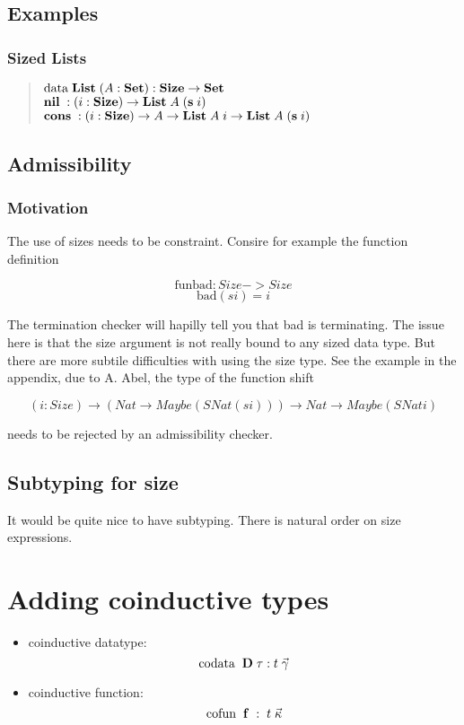 \section{Examples}
\subsection{Sized Lists}
\begin{quote}
$\mathrm{data}\; \mathbf{List}\; ( A : \mathbf{Set} ) : \mathbf{Size} \rightarrow \mathbf{Set} $ 
\\
$\mathbf{nil}\; : ( i : \mathbf{Size} ) \rightarrow  \mathbf{List}\; A \; (\mathbf{s}\; i) $
\\
$\mathbf{cons}\; : ( i : \mathbf{Size} ) \rightarrow  A \rightarrow \mathbf{List}\; A \; i \rightarrow \mathbf{List}\; A \; (\mathbf{s}\; i) $
\end{quote}

\section{Admissibility}
\subsection{Motivation}
The use of sizes needs to be constraint.
Consire for example the function definition

\[ \mathrm{fun} \mathrm{bad} : Size -> Size \]
\[ \mathrm{bad} (s i) = i \]

The termination checker will hapilly tell you that bad is terminating.
The issue here is that the size argument is not really bound to any sized data type.
But there are more subtile difficulties with using the size type.
See the example in the appendix, due to A. Abel,
the type of the function shift

\[ (i : Size) \rightarrow (Nat \rightarrow Maybe (SNat (s i))) \rightarrow Nat \rightarrow Maybe (SNat i) \] 

needs to be rejected by an admissibility checker.


\section{Subtyping for size}
It would be quite nice to have subtyping.
There is natural order on size expressions.


\chapter{Adding coinductive types}

\begin{itemize}
\item
coinductive datatype:
\[\mathrm{codata}\; \; \mathbf{D} \; \tau : t \; \vec{\gamma}\]  

\item
coinductive function:
\[\mathrm{cofun}\; \; \mathbf{f} \; : \; t \; \vec{\kappa}\]
\end{itemize}


